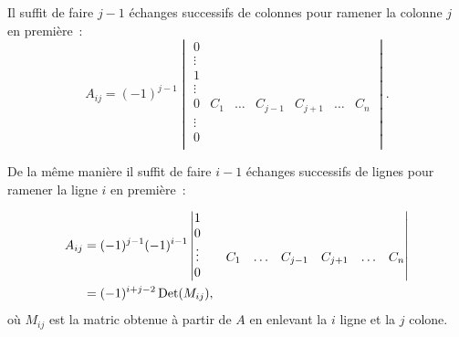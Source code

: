 Il suffit de faire \(j-1\) échanges successifs de colonnes pour ramener la 
colonne \(j\) en première~:
\begin{equation}
  A_{ij} = (-1)^{j-1} \begin{vmatrix} 0     &        &        &      &       
    &        &  \\
    \vdots &        &        &      &       &        &  \\
    1     &        &        &      &       &        &  \\
    \vdots &        &        &      &       &        &  \\
    0     & C_1    & \ldots & C_{j-1}&C_{j+1} & \ldots & C_{n} \\
    \vdots &        &        &      &       &        &  \\
  0     &        &        &      &       &        &  \\    \end{vmatrix}.
\end{equation}

De la même manière il suffit de faire \(i-1\) échanges successifs de 
lignes pour ramener la ligne \(i\) en première~:

\begin{align}
  A_{ij} &= (-1)^{j-1} (-1)^{i-1}
  \begin{vmatrix} 1     &        &        &       &      &        & \\
    0     &        &        &      &       &        &  \\    \vdots &        
    & C_1    & \ldots & C_{j-1}&C_{j+1} & \ldots & C_{n} \\
  0     &        &        &      &       &        &  \\    \end{vmatrix}\\
  &=(-1)^{i+j-2} \operatorname{Det}(M_{ij}),
\end{align}
où \(M_{ij}\) est la matric obtenue à partir de \(A\) en enlevant la 
\(i\)\ieme{} ligne et la \(j\)\ieme{} colone.

